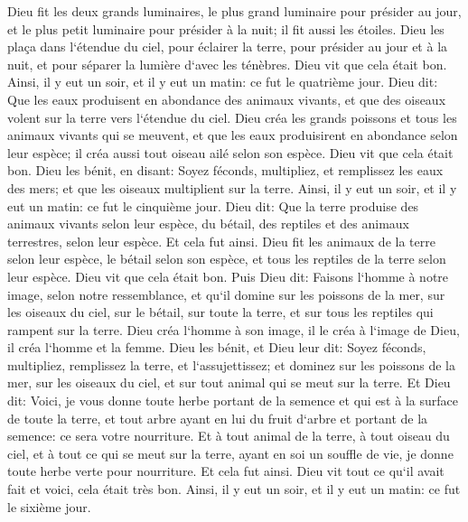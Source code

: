 \verse Dieu fit les deux grands luminaires, le plus grand luminaire pour présider au jour, et le plus petit luminaire pour présider à la nuit; il fit aussi les étoiles. 
\verse Dieu les plaça dans l`étendue du ciel, pour éclairer la terre, 
\verse pour présider au jour et à la nuit, et pour séparer la lumière d`avec les ténèbres. Dieu vit que cela était bon. 
\verse Ainsi, il y eut un soir, et il y eut un matin: ce fut le quatrième jour. 
\verse Dieu dit: Que les eaux produisent en abondance des animaux vivants, et que des oiseaux volent sur la terre vers l`étendue du ciel. 
\verse Dieu créa les grands poissons et tous les animaux vivants qui se meuvent, et que les eaux produisirent en abondance selon leur espèce; il créa aussi tout oiseau ailé selon son espèce. Dieu vit que cela était bon. 
\verse Dieu les bénit, en disant: Soyez féconds, multipliez, et remplissez les eaux des mers; et que les oiseaux multiplient sur la terre. 
\verse Ainsi, il y eut un soir, et il y eut un matin: ce fut le cinquième jour. 
\verse Dieu dit: Que la terre produise des animaux vivants selon leur espèce, du bétail, des reptiles et des animaux terrestres, selon leur espèce. Et cela fut ainsi. 
\verse Dieu fit les animaux de la terre selon leur espèce, le bétail selon son espèce, et tous les reptiles de la terre selon leur espèce. Dieu vit que cela était bon. 
\verse Puis Dieu dit: Faisons l`homme à notre image, selon notre ressemblance, et qu`il domine sur les poissons de la mer, sur les oiseaux du ciel, sur le bétail, sur toute la terre, et sur tous les reptiles qui rampent sur la terre. 
\verse Dieu créa l`homme à son image, il le créa à l`image de Dieu, il créa l`homme et la femme. 
\verse Dieu les bénit, et Dieu leur dit: Soyez féconds, multipliez, remplissez la terre, et l`assujettissez; et dominez sur les poissons de la mer, sur les oiseaux du ciel, et sur tout animal qui se meut sur la terre. 
\verse Et Dieu dit: Voici, je vous donne toute herbe portant de la semence et qui est à la surface de toute la terre, et tout arbre ayant en lui du fruit d`arbre et portant de la semence: ce sera votre nourriture. 
\verse Et à tout animal de la terre, à tout oiseau du ciel, et à tout ce qui se meut sur la terre, ayant en soi un souffle de vie, je donne toute herbe verte pour nourriture. Et cela fut ainsi. 
\verse Dieu vit tout ce qu`il avait fait et voici, cela était très bon. Ainsi, il y eut un soir, et il y eut un matin: ce fut le sixième jour. 

